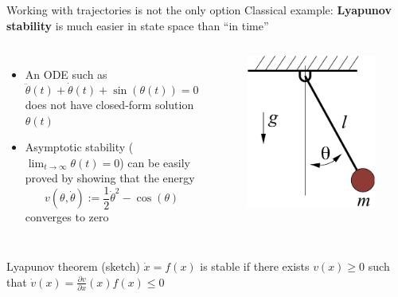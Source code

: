 \documentclass[aspectratio=169]{beamer}
\begin{document}
\begin{frame}{Working with trajectories is not the only option}
Classical example: \textbf{Lyapunov stability} is much easier in state space than ``in time''
\pause
\begin{columns}
\begin{itemize}
\item
An ODE such as
$$
\ddot \theta(t) + \dot \theta(t) + \sin(\theta(t)) = 0
$$
does not have closed-form solution $\theta(t)$
\item<3->
Asymptotic stability ($\lim_{t \rightarrow \infty} \theta(t) = 0$) can be easily proved by showing that the energy
$$
v(\theta, \dot \theta) := \frac{1}{2} \dot \theta^2 - \cos(\theta)
$$
converges to zero
\end{itemize}
\begin{figure}[h]
\includegraphics[width=\columnwidth]{figures/simple_pend.png}
\end{figure}
\end{columns}
\pause \pause
\begin{block}{Lyapunov theorem (sketch)}
$\dot x = f(x)$ is stable if there exists $v(x) \geq 0$ such that $\dot v(x) = \frac{\partial v}{\partial x} (x) f(x) \leq 0$
\end{block}
\end{frame}
\end{document}
